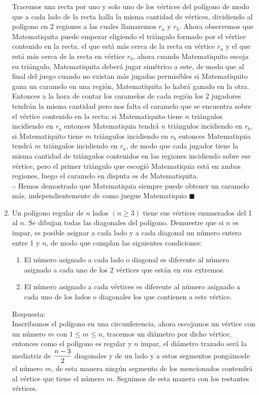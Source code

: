 \documentclass{book}
\begin{document}
\begin{enumerate}
			Tracemos una recta por uno y solo uno de los vértices del polígono de modo que a cada lado de la recta halla la misma cantidad de vértices, dividiendo al polígono en 2 regiones a las cuales llamaremos $r_a$ y $r_b$. Ahora observemos que Matematiquita puede empezar eligiendo el triángulo formado por el vértice contenido en la recta, el que está más cerca de la recta en vértice $r_a$ y el que está más cerca de la recta en vértice $r_b$, ahora cuando Matematiquito escoja su triángulo, Matematiquita deberá jugar simétrico a este, de modo que al final del juego cuando no existan más jugadas permisibles  si Matematiquito gana un caramelo en una región, Matematiquita lo habrá ganado en la otra. Entonces a la hora de contar los caramelos de cada región los 2 jugadores tendrán la misma cantidad pero nos falta el caramelo que se encuentra sobre el vértice contenido en la recta: si Matematiquito tiene $n$ triángulos incidiendo en $r_a$ entonces Matematiquia tendrá $n$ triángulos incidiendo en $r_b$, si Matematiquito tiene $m$ triángulos incidiendo en $r_b$ entonces Matematiquia tendrá $m$ triángulos incidiendo en $r_a$, de modo que cada jugador tiene la misma cantidad de triángulos contenidos en las regiones incidiendo sobre ese vértice, pero el primer triángulo que escogió Matematiquia está en ambas regiones, luego el caramelo en disputa es de Matematiquita.\\
			$\therefore$ Hemos demostrado que Matematiquia siempre puede obtener un caramelo más, independientemente de como juegue Matematiquio $\blacksquare$\\
			\item Un polígono regular de $n$ lados $(n\geq 3)$ tiene sus vértices enumerados del 1 al $n$. Se dibujan todas las diagonales del polígono. Demuestre que si $n$ es impar, es posible asignar a cada lado y a cada diagonal un número entero entre 1 y $n$, de modo que cumplan las siguientes condiciones:
			\begin{enumerate}
				\item El número asignado a cada lado o diagonal es diferente al número asignado a cada uno de los 2 vértices que están en sus extremos.
				\item El número asignado a cada vértices es diferente al número asignado a cada uno de los lados o diagonales los que contienen a este vértice.
			\end{enumerate}
			Respuesta:\\
			Inscribamos el polígono en una circunferencia, ahora escojamos un vértice con un número $m$ con $1\leq m\leq n$, tracemos un diámetro por dicho vértice, entonces como el polígono es regular y $n$ impar, el diámetro trazado será la mediatriz de $\displaystyle{{n-3 \over 2}}$ diagonales y de un lado y a estos segmentos pongámosle el número $m$, de esta manera ningún segmento de los mencionados contendrá al vértice que tiene el número $m$. Seguimos de esta manera con los restantes vértices.\\

\end{enumerate}
\end{document}
